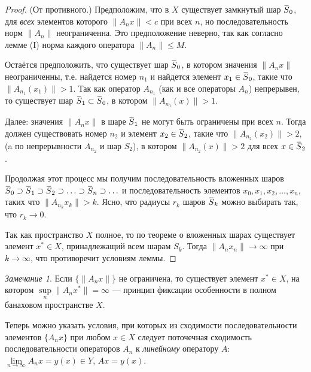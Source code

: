 \documentclass[12pt,a4paper,titlepage,oneside]{book}
\newcommand{\overbar}[1]{\mkern 1.5mu\overline{\mkern-1.5mu#1\mkern-1.5mu}\mkern 1.5mu}
\theoremstyle{definition}
\theoremstyle{plain}
\theoremstyle{break}
\theoremstyle{remark}
\newtheorem*{remark}{Замечание}
\theoremstyle{remark}
\theoremstyle{remark}
\theoremstyle{remark}
\theoremstyle{plain}
\theoremstyle{plain}
\begin{document}
\begin{proof}
(От противного.)
Предположим, что в $X$ существует замкнутый шар $\overbar{S}_0$, для \textit{всех} элементов которого $\lVert A_n x\rVert < c$ при всех $n$, но последовательность норм $\lVert A_n\rVert$ неограниченна. Это предположение неверно, так как согласно лемме (I) норма каждого оператора $\lVert A_n\rVert \leqslant M$.

Остаётся предположить, что существует шар $\overbar{S}_0$, в котором значения $\lVert A_n x\rVert$ неограниченны, т.е. найдется номер $n_1$ и найдется элемент $x_1 \in \overbar{S}_0$, такие что $\lVert A_{n_1} (x_1)\rVert > 1$. Так как оператор $A_{n_1}$ (как и все операторы $A_n$) непрерывен, то существует шар $\overbar{S}_1 \subset \overbar{S}_0$, в котором $\lVert A_{n_1} (x)\rVert > 1$.

Далее: значения $\lVert A_n x\rVert$ в шаре $\overbar{S}_1$ не могут быть ограничены при всех $n$. Тогда должен существовать номер $n_2$ и элемент $x_2 \in \overbar{S}_2$, такие что $\lVert A_{n_2} (x_2)\rVert > 2$, (a по непрерывности $A_{n_2}$ и шар $S_2$), в котором $\lVert A_{n_2} (x)\rVert > 2$ для всех $x \in \overbar{S}_2$.

Продолжая этот процесс мы получим последовательность вложенных шаров $\overbar{S}_0 \supset \overbar{S}_1 \supset \overbar{S}_2 \supset \ldots \supset \overbar{S}_n \supset \ldots$ и последовательность элементов $x_0, x_1, x_2, \ldots, x_n$, таких что $\lVert A_{n_k} x_k\rVert > k$. Ясно, что радиусы $r_k$ шаров $\overbar{S}_k$ можно выбирать так, что $r_k \to 0$.

Так как пространство $X$ полное, то по теореме о вложенных шарах существует элемент $x^* \in X$, принадлежащий всем шарам $S_k$. Тогда $\lVert A_n x_n\rVert \to \infty$ при $k \to \infty$, что противоречит условиям леммы.
\end{proof}

\begin{remark}
Если $\lbrace \lVert A_n x\rVert \rbrace$ не ограничена, то существует элемент $x^* \in X$, на котором $\sup\limits_n \lVert A_n x^*\rVert = \infty$ --- принцип фиксации особенности в полном банаховом пространстве $X$.
\end{remark}

Теперь можно указать условия, при которых из сходимости последовательности элементов $\lbrace A_n x\rbrace$ при любом $x \in X$ следует поточечная сходимость последовательности операторов $A_n$ к \textit{линейному} оператору $A$: $\lim\limits_{n \to \infty}A_n x = y(x) \in Y$, $Ax=y(x)$.
\end{document}
